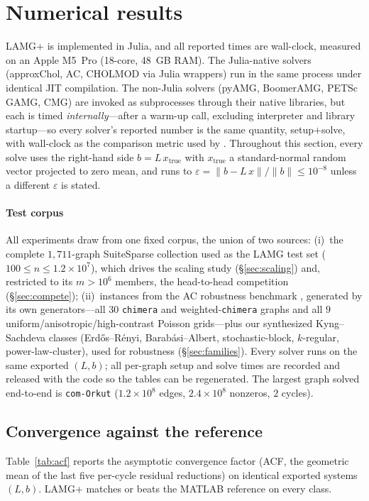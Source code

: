 \documentclass[leqno,letterpaper]{etna}
\begin{document}
\section{Numerical results}\label{sec:results}
LAMG+ is implemented in Julia, and all reported times are wall-clock, measured on an Apple M5~Pro
(18-core, 48~GB RAM). The Julia-native solvers (approxChol, AC, CHOLMOD via Julia wrappers) run
in the same process under identical JIT compilation. The non-Julia solvers (pyAMG, BoomerAMG,
PETSc GAMG, CMG) are invoked as subprocesses through their native libraries, but each is timed
\emph{internally}---after a warm-up call, excluding interpreter and library startup---so every
solver's reported number is the same quantity, setup$+$solve, with wall-clock as the comparison
metric used by \cite{gks2023}.
Throughout this section, every solve uses the right-hand side $b=L\,x_{\mathrm{true}}$ with
$x_{\mathrm{true}}$ a standard-normal random vector projected to zero mean, and runs to
$\varepsilon=\|b-L\,x\|/\|b\|\le10^{-8}$ unless a different $\varepsilon$ is stated.

\paragraph{Test corpus} All experiments draw from one fixed corpus, the union of two sources:
(i)~the complete $1{,}711$-graph SuiteSparse collection used as the LAMG test set
($100\le n\le1.2\!\times\!10^7$), which drives the scaling study (\S\ref{sec:scaling}) and, restricted
to its $m>10^6$ members, the head-to-head competition (\S\ref{sec:compete});
(ii)~instances from the AC robustness benchmark \cite{gks2023}, generated by its
own generators---all $30$ \texttt{chimera} and weighted-\texttt{chimera} graphs and all $9$
uniform/anisotropic/high-contrast Poisson grids---plus our synthesized Kyng--Sachdeva classes
(Erd\H{o}s--R\'enyi, Barab\'asi--Albert, stochastic-block, $k$-regular, power-law-cluster), used for
robustness (\S\ref{sec:families}). Every solver runs on the same exported $(L,b)$; all per-graph setup and solve
times are recorded and released with the code \cite{lamgplus-code} so the tables can be regenerated. The largest graph
solved end-to-end is \texttt{com-Orkut} ($1.2\!\times\!10^8$ edges, $2.4\!\times\!10^8$ nonzeros,
$2$ cycles).

\subsection{Convergence against the reference}\label{sec:acf}
Table~\ref{tab:acf} reports the asymptotic convergence factor (ACF, the geometric mean of
the last five per-cycle residual reductions) on identical exported systems $(L,b)$. LAMG+
matches or beats the MATLAB reference on every class.
\end{document}

